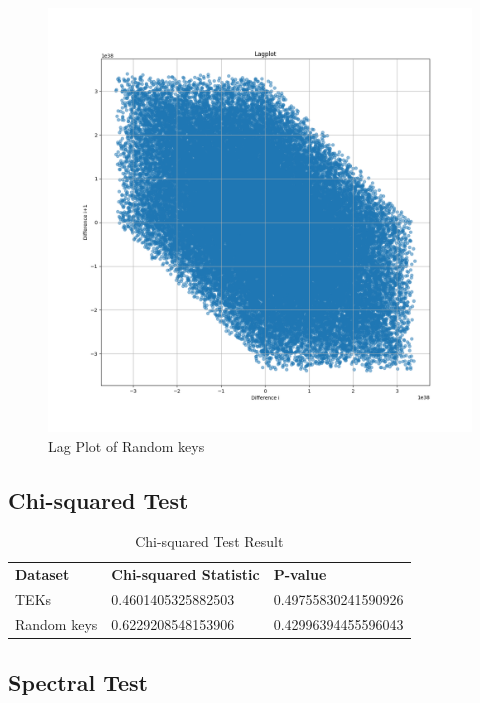 \begin{figure}[H]
\centering
\includegraphics[width=1\textwidth]{lagplotrands50k.png}
\caption{Lag Plot of Random keys}
\label{fig:lagplotrands}
\end{figure}

\subsection{Chi-squared Test}

\begin{table}[H]
\centering
\begin{tabular}{|l|l|l|}
\cline{1-3}
\textbf{Dataset} & \textbf{Chi-squared Statistic}        & \textbf{P-value} \\ \cline{1-3}
TEKs             & 0.4601405325882503  & 0.49755830241590926     \\ \cline{1-3}
Random keys      & 0.6229208548153906 &   0.42996394455596043    \\ \cline{1-3}
\end{tabular}
\caption{Chi-squared Test Result}
\label{table}
\end{table}

\subsection{Spectral Test}

